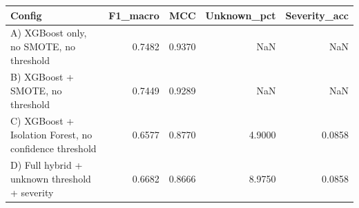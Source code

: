 \begin{tabular}{lrrrr}
\toprule
Config & F1_macro & MCC & Unknown_pct & Severity_acc \\
\midrule
A) XGBoost only, no SMOTE, no threshold & 0.7482 & 0.9370 & NaN & NaN \\
B) XGBoost + SMOTE, no threshold & 0.7449 & 0.9289 & NaN & NaN \\
C) XGBoost + Isolation Forest, no confidence threshold & 0.6577 & 0.8770 & 4.9000 & 0.0858 \\
D) Full hybrid + unknown threshold + severity & 0.6682 & 0.8666 & 8.9750 & 0.0858 \\
\bottomrule
\end{tabular}
